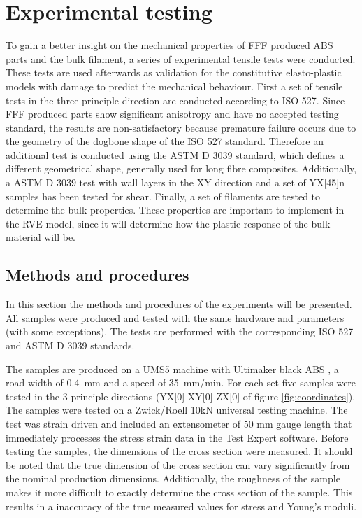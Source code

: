 \chapter{Experimental testing}
\label{chp:5}

\graphicspath{{chapter_5_Experimentaltesting/figures}}

To gain a better insight on the mechanical properties of FFF produced ABS parts and the bulk filament, a series of experimental tensile tests were conducted. These tests are used afterwards as validation for the constitutive elasto-plastic models with damage to predict the mechanical behaviour. First a set of tensile tests in the three principle direction are conducted according to ISO 527\cite{De2013NEN-EN-ISO527-4,Afd2016NEN-EN-ISO527-2}. Since FFF produced parts show significant anisotropy and have no accepted testing standard, the results are non-satisfactory because premature failure occurs due to the geometry of the dogbone shape of the ISO 527 standard. Therefore an additional test is conducted using the ASTM D 3039 \cite{ASTM2008Standard3039} standard, which defines a different geometrical shape, generally used for long fibre composites. Additionally, a ASTM D 3039 test with wall layers in the XY direction and a set of YX[45]n samples has been tested for shear. Finally, a set of filaments are tested to determine the bulk properties. These properties are important to implement in the RVE model, since it will determine how the plastic response of the bulk material will be. 

\section{Methods and procedures}
In this section the methods and procedures of the experiments will be presented. All samples were produced and tested with the same hardware and parameters (with some exceptions). The tests are performed with the corresponding ISO 527 and ASTM D 3039 standards.

The samples are produced on a UMS5 machine with Ultimaker black ABS \cite{Ultimaker2018TechnicalABS}, a road width of 0.4~mm and a speed of 35~mm/min. For each set five samples were tested in the 3 principle directions (YX[0] XY[0] ZX[0] of figure \ref{fig:coordinates}). The samples were tested on a Zwick/Roell 10kN universal testing machine. The test was strain driven and included an extensometer of 50 mm gauge length that immediately processes the stress strain data in the Test Expert software. Before testing the samples, the dimensions of the cross section were measured. It should be noted that the true dimension of the cross section can vary significantly from the nominal production dimensions. Additionally, the roughness of the sample makes it more difficult to exactly determine the cross section of the sample. This results in a inaccuracy of the true measured values for stress and Young's moduli. 

